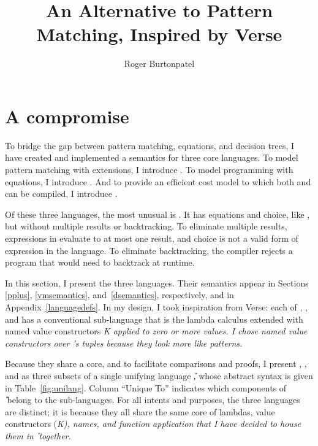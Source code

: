 \documentclass[manuscript,screen,review, 12pt, nonacm]{acmart}
\title{An Alternative to Pattern Matching, Inspired by Verse}
\author{Roger Burtonpatel}
\affiliation{%
\institution{Tufts University}
\streetaddress{419 Boston Ave}
  \city{Medford}
  \state{Massachusetts}
  \country{USA}
  \postcode{02155}
  }
\begin{document}
  
\section{A compromise}
\label{compromise}
    
    To bridge the gap between pattern matching, equations, and decision trees, I
    have created and implemented a semantics for three core languages. To model
    pattern matching with extensions, I introduce \PPlus. To model programming
    with equations, I introduce \VMinus. And to provide an
    efficient cost model to which both \PPlus and \VMinus can be compiled, I
    introduce \D.

    Of these three languages, the most unusual is \VMinus. It has equations and
    choice, like \VC, but without multiple results or backtracking. To eliminate
    multiple results, expressions in \VMinus evaluate to at most one result,
    and choice is not a valid form of expression in the language. To eliminate
    backtracking, the compiler rejects a \VMinus program that would need to
    backtrack at runtime. 
    

    In this section, I present the three languages. Their semantics appear in
    Sections \ref{pplus}, \ref{vmsemantics}, and~\ref{dsemantics},
    respectively, and in Appendix~\ref{languagedefs}. In my design, I took
    inspiration from Verse: each of \PPlus, \VMinus, and \D has a conventional
    sub-language that is the lambda calculus extended with named value
    constructors \it{K} applied to zero or more values. I chose named value
    constructors over \VC's tuples because they look more like patterns. 
    
    Because they share a core, and to facilitate comparisons and proofs, I
    present \VMinus, \PPlus, and \D as three subsets of a single unifying
    language \U, whose abstract syntax is given in Table~\ref{fig:unilang}.
    Column “Unique To” indicates which components of \U\ belong to the
    sub-languages. For all intents and purposes, the three languages are
    distinct; it is because they all share the same core of lambdas, value
    constructors (\it{K}), names, and function application that I have decided
    to house them in \U\ together. 
    
\end{document}
